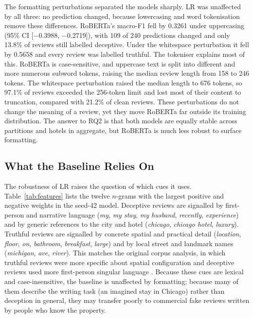 The formatting perturbations separated the models sharply. LR was unaffected by all three: no prediction changed, because lowercasing and word tokenisation remove these differences. RoBERTa's macro-F1 fell by 0.3261 under uppercasing (95\% CI [$-$0.3988, $-$0.2719]), with 109 of 240 predictions changed and only 13.8\% of reviews still labelled deceptive. Under the whitespace perturbation it fell by 0.5658 and every review was labelled truthful. The tokeniser explains most of this. RoBERTa is case-sensitive, and uppercase text is split into different and more numerous subword tokens, raising the median review length from 158 to 246 tokens. The whitespace perturbation raised the median length to 676 tokens, so 97.1\% of reviews exceeded the 256-token limit and lost most of their content to truncation, compared with 21.2\% of clean reviews. These perturbations do not change the meaning of a review, yet they move RoBERTa far outside its training distribution. The answer to RQ2 is that both models are equally stable across partitions and hotels in aggregate, but RoBERTa is much less robust to surface formatting.



\subsection{What the Baseline Relies On}
The robustness of LR raises the question of which cues it uses. Table~\ref{tab:features} lists the twelve $n$-grams with the largest positive and negative weights in the seed-42 model. Deceptive reviews are signalled by first-person and narrative language (\emph{my}, \emph{my stay}, \emph{my husband}, \emph{recently}, \emph{experience}) and by generic references to the city and hotel (\emph{chicago}, \emph{chicago hotel}, \emph{luxury}). Truthful reviews are signalled by concrete spatial and practical detail (\emph{location}, \emph{floor}, \emph{on}, \emph{bathroom}, \emph{breakfast}, \emph{large}) and by local street and landmark names (\emph{michigan}, \emph{ave}, \emph{river}). This matches the original corpus analysis, in which truthful reviews were more specific about spatial configuration and deceptive reviews used more first-person singular language \cite{ref22,ott2013}. Because these cues are lexical and case-insensitive, the baseline is unaffected by formatting; because many of them describe the writing task (an imagined stay in Chicago) rather than deception in general, they may transfer poorly to commercial fake reviews written by people who know the property.

